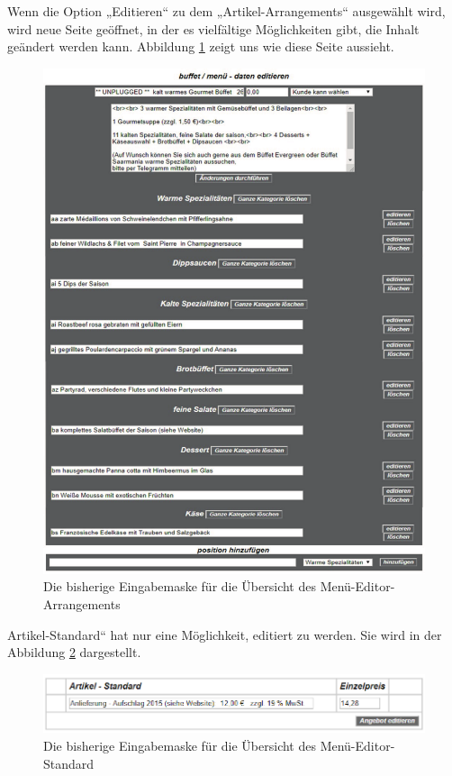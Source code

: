 Wenn die Option „Editieren“ zu dem „Artikel-Arrangements“ ausgewählt wird, wird neue Seite geöffnet, in der es vielfältige Möglichkeiten gibt, die Inhalt geändert werden kann. Abbildung \ref{fig: Editor-Menü2}  zeigt uns wie diese Seite aussieht.


\begin{figure}[h]
	\centering
	\includegraphics[width=0.7\linewidth]{Graphics/arrangement-Menue-editor.pdf}
		\caption[Kun2deansicht]{Die bisherige Eingabemaske für die Übersicht des Menü-Editor-Arrangements}
	\label{fig: Editor-Menü2}
\end{figure}


Artikel-Standard“ hat nur eine Möglichkeit, editiert zu werden. Sie wird in der Abbildung \ref{fig: Editor-Menü-Standard}   dargestellt.

\begin{figure}[h]
	\centering
	\includegraphics[width=0.7\linewidth]{Graphics/menuStandart.png}
	\caption[Kundeansicht]{Die bisherige Eingabemaske für die Übersicht des Menü-Editor-Standard}
	\label{fig: Editor-Menü-Standard}
\end{figure}


